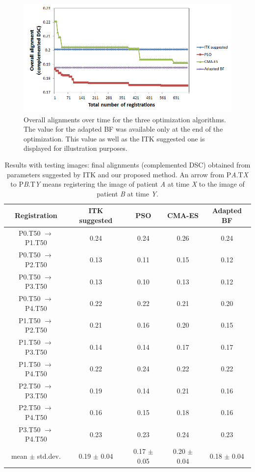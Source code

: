 \documentclass[]{spie}  %
\begin{document}
\begin{figure}
\begin{center}
\includegraphics[width=5in]{results_training}
\end{center}
\caption{Overall alignments over time for the three optimization algorithms. The value for the adapted BF was available only at the end of the optimization. This value as well as the ITK suggested one is displayed for illustration purposes.}
\label{fig:results_training}
\end{figure}

\begin{table}
\caption{Results with testing images: final alignments (complemented DSC) obtained from parameters suggested by ITK and our proposed method. An arrow from P\textit{A}.T\textit{X} to P\textit{B}.T\textit{Y} means registering the image of patient \textit{A} at time \textit{X} to the image of patient \textit{B} at time \textit{Y}.}
\label{tab:results_validation}
\begin{center}
%
\begin{tabular}{c|c|c|c|c}
\hline
Registration & ITK suggested & PSO & CMA-ES & Adapted BF \\
\hline \hline
P0.T50 $\rightarrow$ P1.T50 & 0.24 & 0.24 & 0.26 & 0.24 \\
\hline
P0.T50 $\rightarrow$ P2.T50 & 0.13 & 0.11 & 0.15 & 0.12 \\
\hline
P0.T50 $\rightarrow$ P3.T50 & 0.13 & 0.10 & 0.13 & 0.12 \\
\hline
P0.T50 $\rightarrow$ P4.T50 & 0.22 & 0.22 & 0.21 & 0.20 \\
\hline
P1.T50 $\rightarrow$ P2.T50 & 0.21 & 0.16 & 0.20 & 0.15 \\
\hline
P1.T50 $\rightarrow$ P3.T50 & 0.14 & 0.14 & 0.17 & 0.17 \\
\hline
P1.T50 $\rightarrow$ P4.T50 & 0.22 & 0.24 & 0.22 & 0.22 \\
\hline
P2.T50 $\rightarrow$ P3.T50 & 0.19 & 0.14 & 0.21 & 0.16 \\
\hline
P2.T50 $\rightarrow$ P4.T50 & 0.16 & 0.15 & 0.18 & 0.16 \\
\hline
P3.T50 $\rightarrow$ P4.T50 & 0.23 & 0.23 & 0.24 & 0.23 \\
\hline \hline
mean $\pm$ std.dev. & 0.19 $\pm$ 0.04 & 0.17 $\pm$ 0.05 & 0.20 $\pm$ 0.04 & 0.18 $\pm$ 0.04 \\
\hline
\end{tabular}
%
\end{center}
\end{table}
\end{document}
